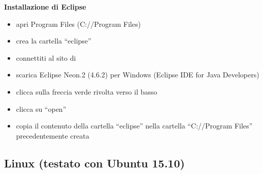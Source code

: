 \documentclass{article}
\begin{document}
\textbf{Installazione di Eclipse}
\begin{itemize}
\item apri Program Files (C://Program Files)
\item crea la cartella ``eclipse''
\item connettiti al sito di \href{https://eclipse.org/downloads/}{}
\item scarica Eclipse Neon.2 (4.6.2) per Windows (Eclipse IDE for Java Developers)
\item clicca sulla freccia verde rivolta verso il basso
\item clicca su ``open''
\item copia il contenuto della cartella ``eclipse'' nella cartella ``C://Program Files'' precedentemente creata
\end{itemize}

\subsection{Linux (testato con Ubuntu 15.10)}
\end{document}
